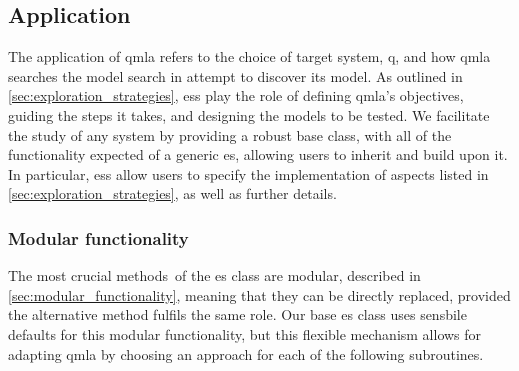 \subsection{Application}\label{sec:application}
The application of \gls{qmla} refers to the choice of target system, \gls{q}, and how \gls{qmla} searches the 
     \gls{model search}  in attempt to discover its model. 
As outlined in \cref{sec:exploration_strategies}, \glspl{es} play the role of 
    defining \gls{qmla}'s objectives, guiding the steps it takes, and designing the models to be tested. 
We facilitate the study of any system by providing a robust  base class,
    with all of the functionality expected of a generic \gls{es}, allowing users to inherit and build upon it. 
In particular, \glspl{es} allow users to specify the implementation of aspects listed in \cref{sec:exploration_strategies}, 
    as well as further details.
\par 


\subsubsection{Modular functionality}\label{sec:modular_functionality_sw}
The most crucial methods\footnotemark \ of the \gls{es} class are modular, 
    described in \cref{sec:modular_functionality},
    meaning that they can be directly replaced, provided the alternative method fulfils the same role. 
Our base \gls{es} class uses sensbile defaults for this modular functionality, 
    but this flexible mechanism allows for adapting \gls{qmla} by choosing an approach for each 
    of the following subroutines. 

